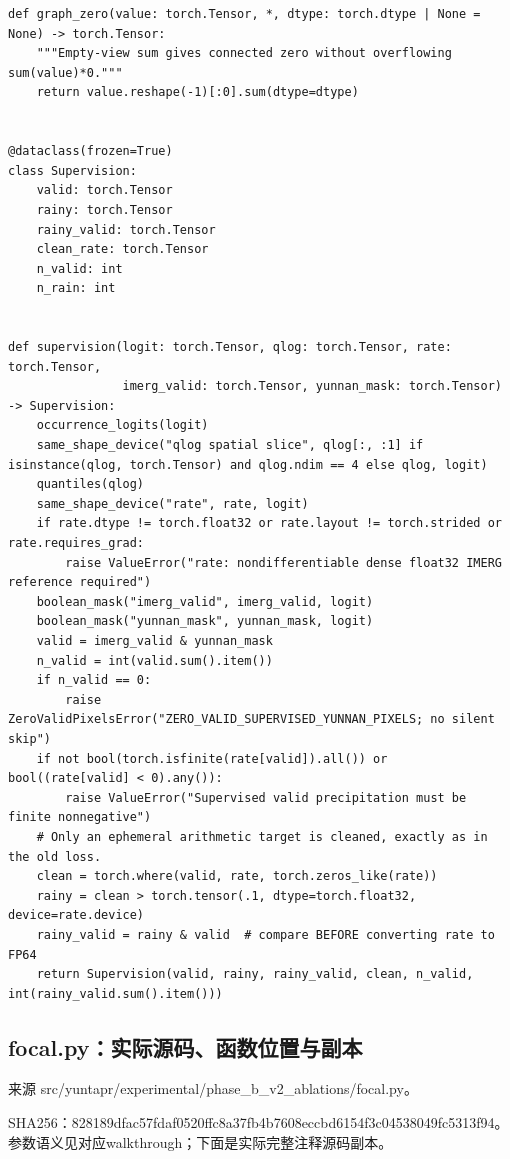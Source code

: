 \documentclass[UTF8,fontset=fandol,10pt]{ctexart}
\begin{document}
\begin{lstlisting}
def graph_zero(value: torch.Tensor, *, dtype: torch.dtype | None = None) -> torch.Tensor:
    """Empty-view sum gives connected zero without overflowing sum(value)*0."""
    return value.reshape(-1)[:0].sum(dtype=dtype)


@dataclass(frozen=True)
class Supervision:
    valid: torch.Tensor
    rainy: torch.Tensor
    rainy_valid: torch.Tensor
    clean_rate: torch.Tensor
    n_valid: int
    n_rain: int


def supervision(logit: torch.Tensor, qlog: torch.Tensor, rate: torch.Tensor,
                imerg_valid: torch.Tensor, yunnan_mask: torch.Tensor) -> Supervision:
    occurrence_logits(logit)
    same_shape_device("qlog spatial slice", qlog[:, :1] if isinstance(qlog, torch.Tensor) and qlog.ndim == 4 else qlog, logit)
    quantiles(qlog)
    same_shape_device("rate", rate, logit)
    if rate.dtype != torch.float32 or rate.layout != torch.strided or rate.requires_grad:
        raise ValueError("rate: nondifferentiable dense float32 IMERG reference required")
    boolean_mask("imerg_valid", imerg_valid, logit)
    boolean_mask("yunnan_mask", yunnan_mask, logit)
    valid = imerg_valid & yunnan_mask
    n_valid = int(valid.sum().item())
    if n_valid == 0:
        raise ZeroValidPixelsError("ZERO_VALID_SUPERVISED_YUNNAN_PIXELS; no silent skip")
    if not bool(torch.isfinite(rate[valid]).all()) or bool((rate[valid] < 0).any()):
        raise ValueError("Supervised valid precipitation must be finite nonnegative")
    # Only an ephemeral arithmetic target is cleaned, exactly as in the old loss.
    clean = torch.where(valid, rate, torch.zeros_like(rate))
    rainy = clean > torch.tensor(.1, dtype=torch.float32, device=rate.device)
    rainy_valid = rainy & valid  # compare BEFORE converting rate to FP64
    return Supervision(valid, rainy, rainy_valid, clean, n_valid, int(rainy_valid.sum().item()))
\end{lstlisting}


\subsection{focal.py：实际源码、函数位置与副本}

来源 src/\allowbreak{}yuntapr/\allowbreak{}experimental/\allowbreak{}phase\_\allowbreak{}b\_\allowbreak{}v2\_\allowbreak{}ablations/\allowbreak{}focal.py。

SHA256：828189dfac57\allowbreak{}fdaf0520ffc8\allowbreak{}a37fb4b7608e\allowbreak{}ccbd6154f3c0\allowbreak{}4538049fc531\allowbreak{}3f94。参数语义见对应walkthrough；下面是实际完整注释源码副本。
\end{document}
